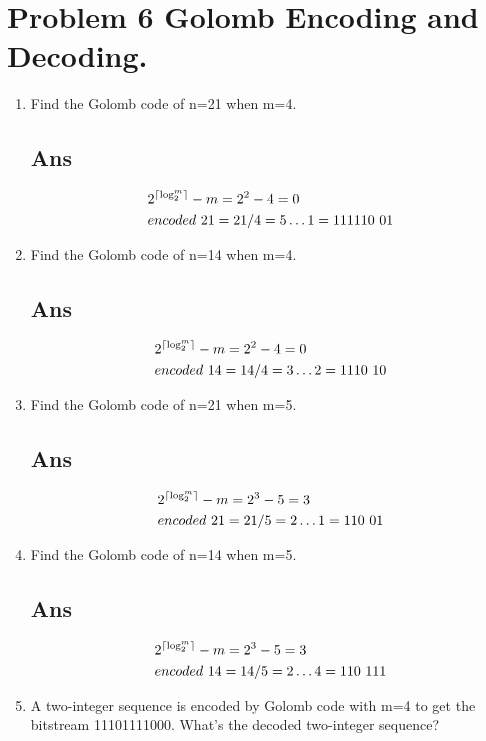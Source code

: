 \documentclass[a4paper, 11pt]{article}
\DeclarePairedDelimiter\ceil{\lceil}{\rceil}
\begin{document}
\section*{Problem 6 Golomb Encoding and Decoding.}
\begin{enumerate}[label=(\alph*)]
  \item Find the Golomb code of n=21 when m=4.
  \subsection*{Ans}
    \begin{align*}
      &2^{\ceil*{\log_2^{m}}}-m=2^{2}-4 = 0 \\
      &encoded~21 = 21/4 = 5 \dots 1 = 111110~01 
    \end{align*}
  \item Find the Golomb code of n=14 when m=4.
  \subsection*{Ans}
  \begin{align*}
    &2^{\ceil*{\log_2^{m}}}-m=2^{2}-4 = 0 \\
    &encoded~14 = 14/4 = 3 \dots 2 = 1110~10 
  \end{align*}
  \item Find the Golomb code of n=21 when m=5.
  \subsection*{Ans}
    \begin{align*}
      &2^{\ceil*{\log_2^{m}}}-m=2^{3}-5 = 3 \\
      &encoded~21 = 21/5 = 2 \dots 1 = 110~01 
    \end{align*}
  \item Find the Golomb code of n=14 when m=5.
  \subsection*{Ans}
    \begin{align*}
      &2^{\ceil*{\log_2^{m}}}-m=2^{3}-5 = 3 \\
      &encoded~14 = 14/5 = 2 \dots 4 = 110~111 
    \end{align*}
  \item A two-integer sequence is encoded by Golomb code with m=4 to get the bitstream
  11101111000. What’s the decoded two-integer sequence?

\end{enumerate}
\end{document}
